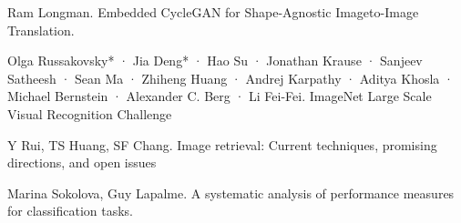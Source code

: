 \documentclass[12pt]{report}
\begin{document}
\begin{thebibliography}{9}
			Ram Longman. Embedded CycleGAN for Shape-Agnostic Imageto-Image Translation.																																					
			
			Olga Russakovsky* · Jia Deng* · Hao Su · Jonathan Krause · Sanjeev Satheesh · Sean Ma · Zhiheng Huang · Andrej Karpathy ·
			Aditya Khosla · Michael Bernstein · Alexander C. Berg · Li Fei-Fei. 
			ImageNet Large Scale Visual Recognition Challenge																		
			
			Y Rui, TS Huang, SF Chang. Image retrieval: Current techniques, promising directions, and open issues																																																																	
		
			Marina Sokolova, Guy Lapalme. A systematic analysis of performance measures for classification tasks.
		\end{thebibliography}
																																																																										
\end{document}

